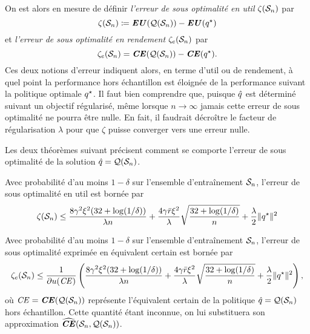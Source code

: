 On est alors en mesure de définir \textit{l'erreur de sous optimalité en util}
$\zeta(\S_n)$ par
\begin{equation}
  \zeta(\S_n) \coloneq \EU(\alg(\S_n)) - \EU(\qs)
\end{equation}
et \textit{l'erreur de sous optimalité en rendement} $\zeta_e(\S_n)$ par
\begin{equation}
  \zeta_e(\S_n) = \CE(\alg(\S_n)) - \CE(\qs).
\end{equation}
Ces deux notions d'erreur indiquent alors, en terme d'util ou de rendement, à quel point
la performance hors échantillon est éloignée de la performance suivant la politique
optimale $\qs$. Il faut bien comprendre que, puisque $\qh$ est déterminé suivant un
objectif régularisé, même lorsque $n\to\infty$ jamais cette erreur de sous optimalité ne pourra
être nulle. En fait, il faudrait décroître le facteur de régularisation $\lambda$ pour que $\zeta$
puisse converger vers une erreur nulle. 

Les deux théorèmes suivant précisent comment se comporte l'erreur de sous optimalité de la
solution $\qh = \alg(\S_n)$.
\begin{thm}
  \label{thm3}
  Avec probabilité d'au moins $1-\delta$ sur l'ensemble d'entraînement $\S_n$, l'erreur de sous
  optimalité en util est bornée par
  \begin{equation}
    \zeta(\S_n) \leq \frac{8\gamma^2\xi^2(32+\log(1/\delta))}{\lambda n} +
    \frac{4\gamma\rmax\xi^2}{\lambda}\sqrt\frac{32+\log(1/\delta)}{n} + \frac{\lambda}{2}\|\qs\|^2 
  \end{equation}
\end{thm}

\begin{thm}
  \label{thm4}
  Avec probabilité d'au moins $1-\delta$ sur l'ensemble d'entraînement $\S_n$, l'erreur de sous
  optimalité exprimée en équivalent certain est bornée par
  \begin{equation}
    \zeta_e(\S_n) \leq \frac{1}{\partial u(\nCE)}\left( \frac{8\gamma^2\xi^2(32+\log(1/\delta))}{\lambda n} +
      \frac{4\gamma\rmax\xi^2}{\lambda}\sqrt\frac{32+\log(1/\delta)}{n} + \frac{\lambda}{2}\|\qs\|^2 \right),
  \end{equation}
  où $\nCE = \CE(\alg(\S_n))$ représente l'équivalent certain de la politique
  $\qh = \alg(\S_n)$ hors échantillon. Cette quantité étant inconnue, on lui substituera
  son approximation $\hCE(\S_n,\alg(\S_n))$.
\end{thm}

